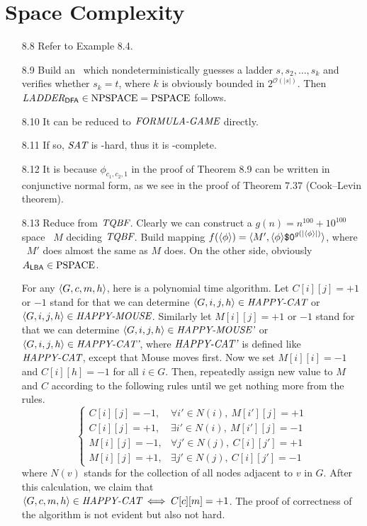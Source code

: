 \section{Space Complexity}

\begin{itemize}
	
	\item[8.8]
	Refer to Example 8.4.
	
	\item[8.9]
	Build an \NTM\ which nondeterministically guesses a ladder $s, s_2, \dots, s_k$ and verifies whether $s_k = t$, where $k$ is obviously bounded in $2^{\mathcal{O}(|s|)}$. Then $\IT{LADDER}_{\DFA} \in \NPSPACE = \PSPACE$ follows.
	
	\item[8.10]
	It can be reduced to $\IT{FORMULA-GAME}$ directly.
	
	\item[8.11]
	If so, $\IT{SAT}$ is \PSPACE -hard, thus it is \PSPACE -complete.
	
	\item[8.12]
	It is because $\phi_{c_1, c_2, 1}$ in the proof of Theorem 8.9 can be written in conjunctive normal form, as we see in the proof of Theorem 7.37 (Cook--Levin theorem).
	
	\item[8.13]
	Reduce from $\IT{TQBF}$. Clearly we can construct a $g(n) = n^{100}+10^{100}$ space \TM\ $M$ deciding $\IT{TQBF}$. Build mapping $f(\Bra{\phi}) = \Bra{M', \Bra{\phi}\TT{\$0}^{g(|\Bra{\phi}|)}}$, where \LBA\ $M'$ does almost the same as $M$ does. On the other side, obviously $A_{\LBA} \in \PSPACE$.
	
	\item[\Star 8.14]
	For any $\Bra{G, c, m, h}$, here is a polynomial time algorithm. Let $C[i][j] = +1$ or $-1$ stand for that we can determine $\Bra{G, i, j, h} \in \IT{HAPPY-CAT}$ or $\Bra{G, i, j, h} \in \IT{HAPPY-MOUSE}$. Similarly let $M[i][j] = +1$ or $-1$ stand for that we can determine $\Bra{G, i, j, h} \in \IT{HAPPY-MOUSE'}$ or $\Bra{G, i, j, h} \in \IT{HAPPY-CAT'}$, where $\IT{HAPPY-CAT'}$ is defined like $\IT{HAPPY-CAT}$, except that Mouse moves first. Now we set $M[i][i] = -1$ and $C[i][h] = -1$ for all $i \in G$. Then, repeatedly assign new value to $M$ and $C$ according to the following rules until we get nothing more from the rules.
	$$
		\left\{
			\begin{array}{ll}
				C[i][j] = -1, & \forall i' \in N(i),\ M[i'][j] = +1 \\
				C[i][j] = +1, & \exists i' \in N(i),\ M[i'][j] = -1 \\
				M[i][j] = -1, & \forall j' \in N(j),\ C[i][j'] = +1 \\
				M[i][j] = +1, & \exists j' \in N(j),\ C[i][j'] = -1
			\end{array}
		\right.
	$$
	where $N(v)$ stands for the collection of all nodes adjacent to $v$ in $G$. After this calculation, we claim that $\Bra{G, c, m, h} \in \IT{HAPPY-CAT} \iff C[c][m] = +1$. The proof of correctness of the algorithm is not evident but also not hard.
	

\end{itemize}
